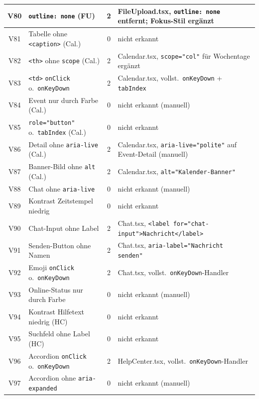 \begin{longtable}{|c|p{5.0cm}|c|p{5.4cm}|}
V80  & \texttt{outline: none} (FU)                  & 2 & FileUpload.tsx, \texttt{outline: none} entfernt; Fokus-Stil ergänzt \\ \hline
V81  & Tabelle ohne \texttt{<caption>} (Cal.)        & 0 & nicht erkannt \\ \hline
V82  & \texttt{<th>} ohne \texttt{scope} (Cal.)     & 2 & Calendar.tsx, \texttt{scope="col"} für Wochentage ergänzt \\ \hline
V83  & \texttt{<td>} \texttt{onClick} o.\ \texttt{onKeyDown} & 2 & Calendar.tsx, vollst.\ \texttt{onKeyDown} + \texttt{tabIndex} \\ \hline
V84  & Event nur durch Farbe (Cal.)                 & 0 & nicht erkannt (manuell) \\ \hline
V85  & \texttt{role="button"} o.\ \texttt{tabIndex} (Cal.) & 0 & nicht erkannt \\ \hline
V86  & Detail ohne \texttt{aria-live} (Cal.)        & 2 & Calendar.tsx, \texttt{aria-live="polite"} auf Event-Detail (manuell) \\ \hline
V87  & Banner-Bild ohne \texttt{alt} (Cal.)         & 2 & Calendar.tsx, \texttt{alt="Kalender-Banner"} \\ \hline
V88  & Chat ohne \texttt{aria-live}                 & 0 & nicht erkannt (manuell) \\ \hline
V89  & Kontrast Zeitstempel niedrig                 & 0 & nicht erkannt \\ \hline
V90  & Chat-Input ohne Label                        & 2 & Chat.tsx, \texttt{<label for="chat-input">Nachricht</label>} \\ \hline
V91  & Senden-Button ohne Namen                     & 2 & Chat.tsx, \texttt{aria-label="Nachricht senden"} \\ \hline
V92  & Emoji \texttt{onClick} o.\ \texttt{onKeyDown} & 2 & Chat.tsx, vollst.\ \texttt{onKeyDown}-Handler \\ \hline
V93  & Online-Status nur durch Farbe                & 0 & nicht erkannt (manuell) \\ \hline
V94  & Kontrast Hilfetext niedrig (HC)              & 0 & nicht erkannt \\ \hline
V95  & Suchfeld ohne Label (HC)                     & 0 & nicht erkannt \\ \hline
V96  & Accordion \texttt{onClick} o.\ \texttt{onKeyDown} & 2 & HelpCenter.tsx, vollst.\ \texttt{onKeyDown}-Handler \\ \hline
V97  & Accordion ohne \texttt{aria-expanded}        & 0 & nicht erkannt (manuell) \\ \hline

\end{longtable}
